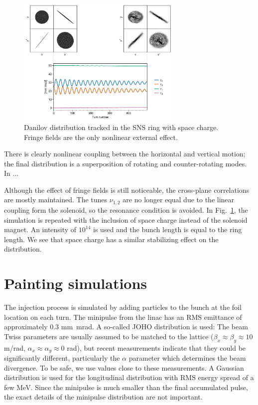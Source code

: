 %
%
\begin{figure}[!p]
    \centering
    \includegraphics[width=0.7\textwidth]{Images/chapter3/fringe_spacecharge.png}
    \caption{Danilov distribution tracked in the SNS ring with space charge. Fringe fields are the only nonlinear external effect.}
    \label{fig:fringe_c}
    \vspace*{3cm}
\end{figure}
%

There is clearly nonlinear coupling between the horizontal and vertical motion; the final distribution is a superposition of rotating and counter-rotating modes. In ...

Although the effect of fringe fields is still noticeable, the cross-plane correlations are mostly maintained. The tunes $\nu_{1, 2}$ are no longer equal due to the linear coupling form the solenoid, so the resonance condition is avoided. In Fig.~\ref{fig:fringe_c}, the simulation is repeated with the inclusion of space charge instead of the solenoid magnet. An intensity of $10^{14}$ is used and the bunch length is equal to the ring length. We see that space charge has a similar stabilizing effect on the distribution.


\section{Painting simulations}

The injection process is simulated by adding particles to the bunch at the foil location on each turn. The minipulse from the linac has an RMS emittance of approximately 0.3 mm~mrad. A so-called JOHO distribution is used:
%
%
The beam Twiss parameters are usually assumed to be matched to the lattice ($\beta_x \approx \beta_y \approx 10$ m/rad, $\alpha_x \approx \alpha_y \approx 0$ rad), but recent measurements indicate that they could be significantly different, particularly the $\alpha$ parameter which determines the beam divergence. To be safe, we use values close to these measurements. A Gaussian distribution is used for the longitudinal distribution with RMS energy spread of a few MeV. Since the minipulse is much smaller than the final accumulated pulse, the exact details of the minipulse distribution are not important.


